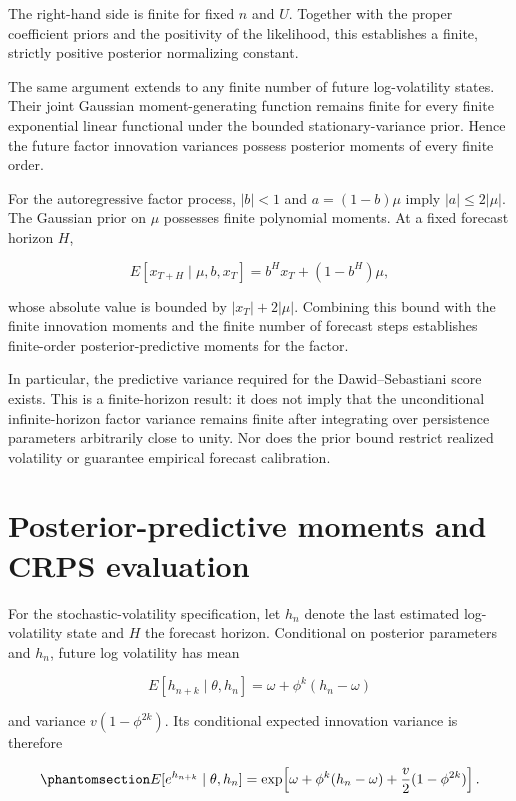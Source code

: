 \documentclass[
  12pt,
  letterpaper,
  DIV=11,
  numbers=noendperiod]{scrreprt}
\begin{document}
The right-hand side is finite for fixed \(n\) and \(U\). Together with
the proper coefficient priors and the positivity of the likelihood, this
establishes a finite, strictly positive posterior normalizing constant.

The same argument extends to any finite number of future log-volatility
states. Their joint Gaussian moment-generating function remains finite
for every finite exponential linear functional under the bounded
stationary-variance prior. Hence the future factor innovation variances
possess posterior moments of every finite order.

For the autoregressive factor process, \(|b|<1\) and \(a=(1-b)\mu\)
imply \(|a|\leq2|\mu|\). The Gaussian prior on \(\mu\) possesses finite
polynomial moments. At a fixed forecast horizon \(H\),

\[
E[x_{T+H}\mid\mu,b,x_T]
=b^Hx_T+(1-b^H)\mu,
\]

whose absolute value is bounded by \(|x_T|+2|\mu|\). Combining this
bound with the finite innovation moments and the finite number of
forecast steps establishes finite-order posterior-predictive moments for
the factor.

In particular, the predictive variance required for the
Dawid--Sebastiani score exists. This is a finite-horizon result: it does
not imply that the unconditional infinite-horizon factor variance
remains finite after integrating over persistence parameters arbitrarily
close to unity. Nor does the prior bound restrict realized volatility or
guarantee empirical forecast calibration.

\section{Posterior-predictive moments and CRPS
evaluation}\label{posterior-predictive-moments-and-crps-evaluation}

For the stochastic-volatility specification, let \(h_n\) denote the last
estimated log-volatility state and \(H\) the forecast horizon.
Conditional on posterior parameters and \(h_n\), future log volatility
has mean

\[
E[h_{n+k}\mid\theta,h_n]
=\omega+\phi^k(h_n-\omega)
\]

and variance \(v(1-\phi^{2k})\). Its conditional expected innovation
variance is therefore

\begin{equation}\protect\phantomsection\label{eq-sv-forecast-variance}{
E[e^{h_{n+k}}\mid\theta,h_n]
=
\exp\!\left[
\omega+\phi^k(h_n-\omega)
+\frac v2(1-\phi^{2k})
\right].
}\end{equation}
\end{document}

